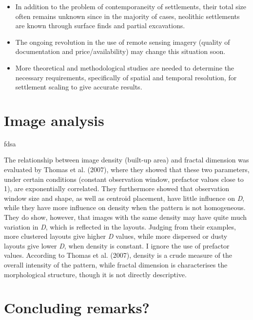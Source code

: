 \documentclass[
  12pt,
]{book}
\begin{document}
\begin{itemize}
  \begin{itemize}
  \item
    In addition to the problem of contemporaneity of settlements, their total size often remains unknown since in the majority of cases, neolithic settlements are known through surface finds and partial excavations.
  \item
    The ongoing revolution in the use of remote sensing imagery (quality of documentation and price/availability) may change this situation soon.
  \item
    More theoretical and methodological studies are needed to determine the necessary requirements, specifically of spatial and temporal resolution, for settlement scaling to give accurate results.
  \end{itemize}
\end{itemize}

\hypertarget{image-analysis}{%
\section{Image analysis}\label{image-analysis}}

fdsa

The relationship between image density (built-up area) and fractal dimension was evaluated by Thomas et al. (2007), where they showed that these two parameters, under certain conditions (constant observation window, prefactor values close to 1), are exponentially correlated. They furthermore showed that observation window size and shape, as well as centroid placement, have little influence on \emph{D}, while they have more influence on density when the pattern is not homogeneous. They do show, however, that images with the same density may have quite much variation in \emph{D}, which is reflected in the layouts. Judging from their examples, more clustered layouts give higher \emph{D} values, while more dispersed or dusty layouts give lower \emph{D}, when density is constant. I ignore the use of prefactor values. According to Thomas et al. (2007), density is a crude measure of the overall intensity of the pattern, while fractal dimension is characterises the morphological structure, though it is not directly descriptive.

\hypertarget{concluding-remarks}{%
\section{Concluding remarks?}\label{concluding-remarks}}
\end{document}
